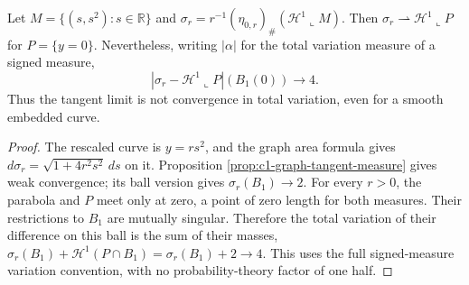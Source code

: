 \begin{example}\label{ex:parabola-weak-not-variation}
Let $M=\{(s,s^2):s\in\mathbb R\}$ and $\sigma_r=r^{-1}(\eta_{0,r})_\#(\mathcal H^1\llcorner M)$. Then $\sigma_r\rightharpoonup\mathcal H^1\llcorner P$ for $P=\{y=0\}$. Nevertheless, writing $|\alpha|$ for the total variation measure of a signed measure,
\[
 \left|\sigma_r-\mathcal H^1\llcorner P\right|(B_1(0))\longrightarrow4.
\]
Thus the tangent limit is not convergence in total variation, even for a smooth embedded curve.
\end{example}
\begin{proof}
The rescaled curve is $y=rs^2$, and the graph area formula gives $d\sigma_r=\sqrt{1+4r^2s^2}\,ds$ on it. Proposition \ref{prop:c1-graph-tangent-measure} gives weak convergence; its ball version gives $\sigma_r(B_1)\to2$. For every $r>0$, the parabola and $P$ meet only at zero, a point of zero length for both measures. Their restrictions to $B_1$ are mutually singular. Therefore the total variation of their difference on this ball is the sum of their masses, $\sigma_r(B_1)+\mathcal H^1(P\cap B_1)=\sigma_r(B_1)+2\to4$. This uses the full signed-measure variation convention, with no probability-theory factor of one half.
\end{proof}

